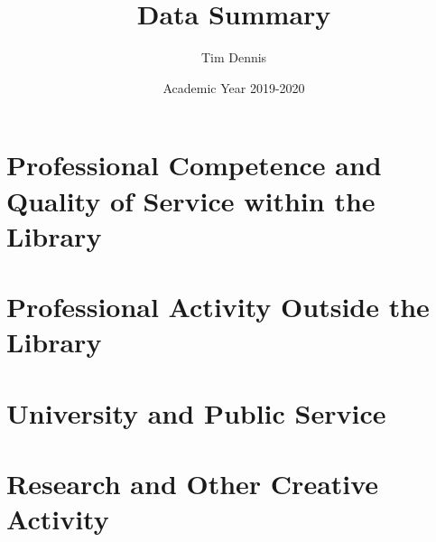 \documentclass[12pt, oneside]{article}
\title{Data Summary}
\author{Tim Dennis}
\date{Academic Year 2019-2020}
\begin{document}
\date{}
\maketitle
\thispagestyle{fancy}



\section{Professional Competence and Quality of Service within the Library}




\section{Professional Activity Outside the Library}



\section{University and Public Service}



\section{Research and Other Creative Activity}


\end{document}
